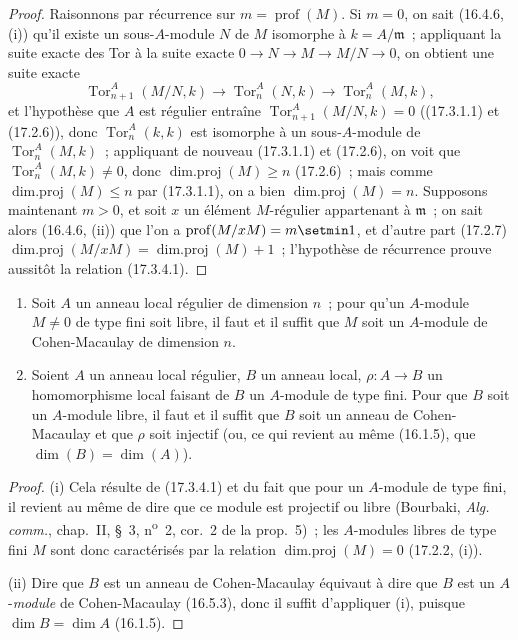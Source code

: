 \begin{proof}
Raisonnons par récurrence sur $m=\operatorname{prof}(M)$. Si $m=0$, on sait
(16.4.6, (i)) qu'il existe un sous-$A$-module $N$ de $M$ isomorphe à
$k=A/\mathfrak{m}$~; appliquant la suite exacte des Tor à la suite exacte
$0\longrightarrow N\longrightarrow M\longrightarrow M/N\longrightarrow0$,
on obtient une suite exacte
\[
  \operatorname{Tor}^A_{n+1}(M/N,k)\longrightarrow
  \operatorname{Tor}^A_n(N,k)\longrightarrow
  \operatorname{Tor}^A_n(M,k),
\]
et l'hypothèse que $A$ est régulier entraîne
$\operatorname{Tor}^A_{n+1}(M/N,k)=0$ ((17.3.1.1) et (17.2.6)), donc
$\operatorname{Tor}^A_n(k,k)$ est isomorphe à un sous-$A$-module de
$\operatorname{Tor}^A_n(M,k)$~; appliquant de nouveau (17.3.1.1) et (17.2.6),
on voit que $\operatorname{Tor}^A_n(M,k)\neq0$, donc
$\operatorname{dim.proj}(M)\geq n$ (17.2.6)~; mais comme
$\operatorname{dim.proj}(M)\leq n$ par (17.3.1.1), on a bien
$\operatorname{dim.proj}(M)=n$.
Supposons maintenant $m>0$, et soit $x$ un élément $M$-régulier appartenant à
$\mathfrak{m}$~; on sait alors (16.4.6, (ii)) que l'on a
$\operatorname{prof}(M/xM)=m\setmin 1$, et d'autre part (17.2.7)
$\operatorname{dim.proj}(M/xM)=\operatorname{dim.proj}(M)+1$~; l'hypothèse de
récurrence prouve aussitôt la relation (17.3.4.1).
\end{proof}


\begin{corollary}[17.3.5]
\label{0.17.3.5-fr}
\begin{enumerate}
  \item[\rm(i)] Soit $A$ un anneau local régulier de dimension $n$~; pour
  qu'un $A$-module $M\neq0$ de type fini soit libre, il faut et il suffit que
  $M$ soit un $A$-module de Cohen-Macaulay de dimension $n$.
  \item[\rm(ii)] Soient $A$ un anneau local régulier, $B$ un anneau local,
  $\rho:A\to B$ un homomorphisme local faisant de $B$ un $A$-module de type
  fini. Pour que $B$ soit un $A$-module libre, il faut et il suffit que $B$
  soit un anneau de Cohen-Macaulay et que $\rho$ soit injectif \textup{(ou, ce qui
  revient au même (16.1.5), que $\dim(B)=\dim(A)$)}.
\end{enumerate}
\end{corollary}

\begin{proof}
(i) Cela résulte de (17.3.4.1) et du fait que pour un $A$-module de type fini,
il revient au même de dire que ce module est projectif ou libre (Bourbaki,
\emph{Alg. comm.}, chap.~II, \S~3, n\textsuperscript{o}~2, cor.~2 de la
prop.~5)~; les $A$-modules libres de type fini $M$ sont donc caractérisés par
la relation $\operatorname{dim.proj}(M)=0$ (17.2.2, (i)).

(ii) Dire que $B$ est un anneau de Cohen-Macaulay équivaut à dire que $B$ est
un $A$-\emph{module} de Cohen-Macaulay (16.5.3), donc il suffit d'appliquer (i),
puisque $\dim B=\dim A$ (16.1.5).
\end{proof}

